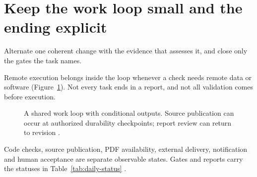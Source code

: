 
\section{Keep the work loop small and the ending explicit}

\begin{headline}
  Alternate one coherent change with the evidence that assesses it, and close only the
  gates the task names.
\end{headline}

Remote execution belongs inside the loop whenever a check needs remote data or software
(Figure~\ref{fig:loop}). Not every task ends in a report, and not all validation comes
before execution.

\begin{figure}[H]
  \centering
  \caption{A shared work loop with conditional outputs. Source publication can
    occur at authorized durability checkpoints; report review can return to revision
    \cites[Verify and hand back]{skill:coding}[Review and release]{skill:report-production}
    [Commit and hand off]{skill:git}.}
  \label{fig:loop}
\end{figure}

Code checks, source publication, PDF availability, external delivery, notification and
human acceptance are separate observable states. Gates and reports carry the statuses in
Table~\ref{tab:daily-status} \cite[Review and release]{skill:report-production}.

